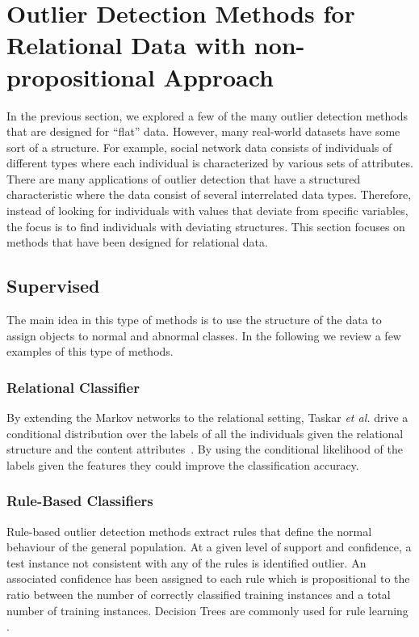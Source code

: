 \section{Outlier Detection Methods for Relational Data with non-propositional Approach}
 \label{sec:outlierinSRL}
In the previous section, we explored a few of the many outlier detection methods that are designed for ``flat'' data. However, many real-world datasets have some sort of a structure. For example, social network data consists of individuals of different types where each individual is characterized by various sets of attributes.
There are many applications of outlier detection that have a structured characteristic where the data consist of several interrelated data types. Therefore, instead of looking for individuals with values that deviate from specific variables, the focus is to find individuals with deviating structures. 
 This section focuses on methods that have been designed for relational data.
\subsection{Supervised}
The main idea in this type of methods is to use the structure of the data to assign objects to normal and abnormal classes. In the following we review a few examples of this type of methods.

\subsubsection{Relational Classifier}
By extending the Markov networks to the relational setting, Taskar {\em et al.} drive a conditional distribution over the labels of all the individuals given the relational structure and the content attributes~\cite{Taskar2002}. By using the conditional likelihood of the labels given the features they could improve the classification accuracy.  

\subsubsection{Rule-Based Classifiers}
Rule-based outlier detection methods extract rules that define the normal behaviour of the general population. At a given level of support and confidence, a test instance not consistent with any of the rules is identified outlier. An associated confidence has been assigned to each rule which is propositional to the ratio between the number of correctly classified training instances and a total number of training instances. Decision Trees are commonly used for rule learning \cite{Shuchita2012}.


